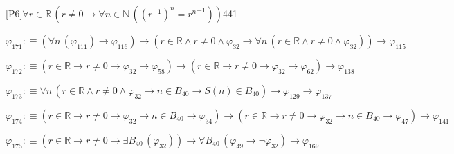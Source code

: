 \begin{fullproof}{[P6]}{$\forall r \in \mathbb{R}\,(r \neq 0 \to \forall n \in \mathbb{N}\,({{(r^{-1})}^{n}} = {{r}^{n}}^{-1}))$}{441}
\begin{abbrevlist}
\item $\varphi_{171} :\equiv (\forall n\,(\varphi_{111}) \to \varphi_{116}) \to (r \in \mathbb{R} \land r \neq 0 \land \varphi_{32} \to \forall n\,(r \in \mathbb{R} \land r \neq 0 \land \varphi_{32})) \to \varphi_{115}$
\item $\varphi_{172} :\equiv (r \in \mathbb{R} \to r \neq 0 \to \varphi_{32} \to \varphi_{58}) \to (r \in \mathbb{R} \to r \neq 0 \to \varphi_{32} \to \varphi_{62}) \to \varphi_{138}$
\item $\varphi_{173} :\equiv \forall n\,(r \in \mathbb{R} \land r \neq 0 \land \varphi_{32} \to n \in B_{40} \to S(n) \in B_{40}) \to \varphi_{129} \to \varphi_{137}$
\item $\varphi_{174} :\equiv (r \in \mathbb{R} \to r \neq 0 \to \varphi_{32} \to n \in B_{40} \to \varphi_{34}) \to (r \in \mathbb{R} \to r \neq 0 \to \varphi_{32} \to n \in B_{40} \to \varphi_{47}) \to \varphi_{141}$
\item $\varphi_{175} :\equiv (r \in \mathbb{R} \to r \neq 0 \to \exists B_{40}\,(\varphi_{32})) \to \forall B_{40}\,(\varphi_{49} \to \neg \varphi_{32}) \to \varphi_{169}$
\end{abbrevlist}
\end{fullproof}
